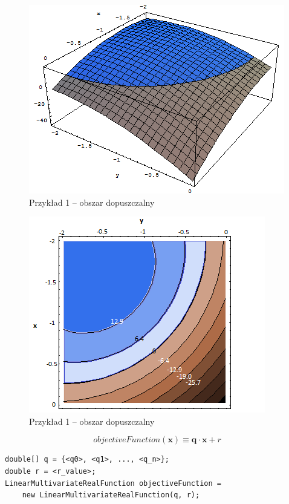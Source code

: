 \documentclass{beamer}
\begin{document}
\begin{frame}
    \begin{figure}
        \caption{Przykład 1 -- obszar dopuszczalny}
        \includegraphics[scale=0.75]{images/example1_1.png}
    \end{figure}
\end{frame}

\begin{frame}
    \begin{figure}
        \caption{Przykład 1 -- obszar dopuszczalny}
        \includegraphics[scale=0.75]{images/example1_2.png}
    \end{figure}
\end{frame}

\begin{frame}[fragile]
    $$
        objectiveFunction(\textbf{x}) \equiv \textbf{q} \cdot \textbf{x} + r
    $$

    \begin{Verbatim}[fontsize=\small]
double[] q = {<q0>, <q1>, ..., <q_n>};
double r = <r_value>;
LinearMultivariateRealFunction objectiveFunction =
    new LinearMultivariateRealFunction(q, r);
    \end{Verbatim}
\end{frame}
\end{document}

